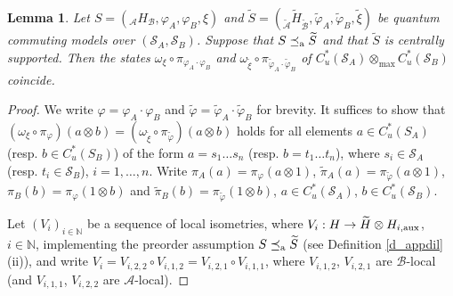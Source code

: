 \documentclass[11pt]{amsart}
\newtheorem{lemma}[theorem]{Lemma}
\theoremstyle{definition}
\newcommand\nph{\varphi}
\newcommand{\cl}[1]{\mathcal{#1}}
\newcommand{\bb}[1]{\mathbb{#1}}
\providecommand{\wt}[1]{\widetilde{#1}}
\begin{document}
\begin{lemma}\label{p_apextends}
 Let $S = (_{\cl A}H_{\cl B}, \varphi_A, \varphi_B, \xi)$ and
 $\wt{S} = (_{\wt{\cl A}}\wt{H}_{\wt{\cl B}}, \wt{\varphi}_A, 
 \wt{\varphi}_B, \wt{\xi})$ be quantum commuting models
 over $(\cl S_A,\cl S_B)$. 
 Suppose that $S\preceq_{\rm a} \wt{S}$ and that $\wt{S}$ is centrally supported. 
 Then the states 
 $\omega_\xi\circ\pi_{\varphi_A\cdot\varphi_B}$
 and $\omega_{\wt{\xi}}\circ\pi_{\wt{\varphi}_A\cdot\wt{\varphi}_B}$ of $C^*_u(\cl S_A)\otimes_{\max} C^*_u(\cl S_B)$ coincide. 
\end{lemma}

\begin{proof}
We write $\nph = \nph_A\cdot\nph_B$ and 
$\wt{\nph} = \wt{\nph}_A\cdot \wt{\nph}_B$ for brevity. 
It suffices to show that  $(\omega_\xi\circ\pi_{\varphi})(a\otimes b) = (\omega_{\wt{\xi}}\circ\pi_{\wt{\varphi}})(a\otimes b)$ holds for all 
elements $a\in C_u^*(S_A)$ (resp. $b\in C_u^*(S_B)$) of the form 
$a = s_1\ldots s_n$ (resp. $b = t_1\ldots t_n$), where $s_i\in \cl S_A$
(resp. $t_i\in\cl S_B$), $i = 1,\dots,n$. 
Write $\pi_A(a) = \pi_\varphi(a\otimes 1)$, $\wt\pi_A(a) = \pi_{\wt\varphi}(a\otimes 1)$, 
$\pi_B(b) = \pi_\varphi(1\otimes b)$ and $\wt\pi_B(b) = \pi_{\wt\varphi}(1\otimes b)$, $a\in C_u^*(\cl S_A)$, $b\in C_u^*(\cl S_B)$. 

Let $(V_i)_{i\in \bb{N}}$ be a sequence of local isometries, 
where $V_i : H\to \wt{H}\otimes H_{i,\rm aux}$, $i\in \bb{N}$,
implementing the preorder assumption $S\preceq_{\rm a} \wt{S}$
(see Definition \ref{d_appdil} (ii)), and write
$V_i = V_{i,2,2}\circ V_{i,1,2} = V_{i,2,1}\circ V_{i,1,1}$, where 
$V_{i,1,2}$, $V_{i,2,1}$ are $\cl{B}$-local (and $V_{i,1,1}$, $V_{i,2,2}$  are $\cl{A}$-local).


\end{proof}
\end{document}
